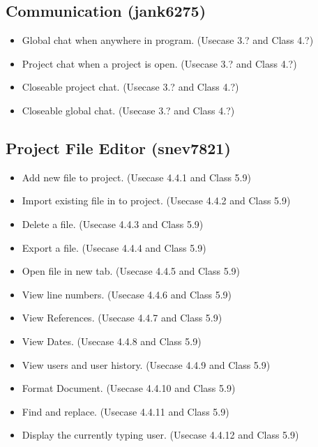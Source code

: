 \documentclass[11pt]{report}
\begin{document}
    \subsection{Communication (jank6275)}
        \begin{itemize}
            \item Global chat when anywhere in program. (Usecase 3.? and Class 4.?)
            \item Project chat when a project is open. (Usecase 3.? and Class 4.?)
            \item Closeable project chat. (Usecase 3.? and Class 4.?)
            \item Closeable global chat. (Usecase 3.? and Class 4.?)
        \end{itemize}
    \subsection{Project File Editor (snev7821)}
        \begin{itemize}
            \item Add new file to project. (Usecase 4.4.1 and Class 5.9)
            \item Import existing file in to project. (Usecase 4.4.2 and Class 5.9)
            \item Delete a file. (Usecase 4.4.3 and Class 5.9)
            \item Export a file. (Usecase 4.4.4 and Class 5.9)
            \item Open file in new tab. (Usecase 4.4.5 and Class 5.9)
            \item View line numbers. (Usecase 4.4.6 and Class 5.9)
            \item View References. (Usecase 4.4.7 and Class 5.9)
            \item View Dates. (Usecase 4.4.8 and Class 5.9)
            \item View users and user history. (Usecase 4.4.9 and Class 5.9)
            \item Format Document. (Usecase 4.4.10 and Class 5.9)
            \item Find and replace. (Usecase 4.4.11 and Class 5.9)
            \item Display the currently typing user. (Usecase 4.4.12 and Class 5.9)
        \end{itemize}
\end{document}
